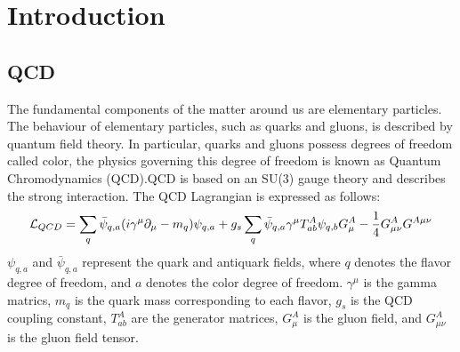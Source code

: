 
\section{Introduction}
    \subsection{QCD}
    \label{Intro:QCD}
        The fundamental components of the matter around us are elementary particles. The behaviour of elementary particles, such as quarks and gluons, is described by quantum field theory. In particular, quarks and gluons possess degrees of freedom called color, the physics governing this degree of freedom is known as Quantum Chromodynamics (QCD).\@ QCD is based on an SU(3) gauge theory and describes the strong interaction. The QCD Lagrangian is expressed as follows:
        \begin{eqnarray}
            \label{QCDlagrangian}
            \mathcal{L}_{QCD}=\sum_q \bar{\psi}_{q,a}\qty(i\gamma^\mu\partial_\mu-m_q)\psi_{q,a}+g_s \sum_q \bar{\psi}_{q,a}\gamma^\mu T^A_{ab}\psi_{q,b}G^A_\mu-\frac{1}{4}G^A_{\mu\nu}G^{A\mu\nu}
        \end{eqnarray}
        $\psi_{q,a}$ and $\bar{\psi}_{q,a}$ represent the quark and antiquark fields, where $q$ denotes the flavor degree of freedom, and $a$ denotes the color degree of freedom. $\gamma^\mu$ is the gamma matrics, $m_q$ is the quark mass corresponding to each flavor, $g_s$ is the QCD coupling constant, $T^A_{ab}$ are the generator matrices, $G^A_\mu$ is the gluon field, and $G^A_{\mu\nu}$ is the gluon field tensor.

